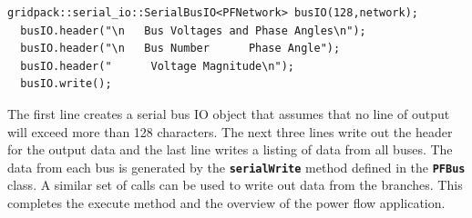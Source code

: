 {
\color{red}
\begin{Verbatim}[fontseries=b]
  gridpack::serial_io::SerialBusIO<PFNetwork> busIO(128,network);
  busIO.header("\n   Bus Voltages and Phase Angles\n");
  busIO.header("\n   Bus Number      Phase Angle");
  busIO.header("      Voltage Magnitude\n");
  busIO.write();
\end{Verbatim}
}

The first line creates a serial bus IO object that assumes that no line of output will exceed more than 128 characters. The next three lines write out the header for the output data and the last line writes a listing of data from all buses. The data from each bus is generated by the \texttt{\textbf{serialWrite}} method defined in the \texttt{\textbf{PFBus}} class. A similar set of calls can be used to write out data from the branches. This completes the execute method and the overview of the power flow application.
